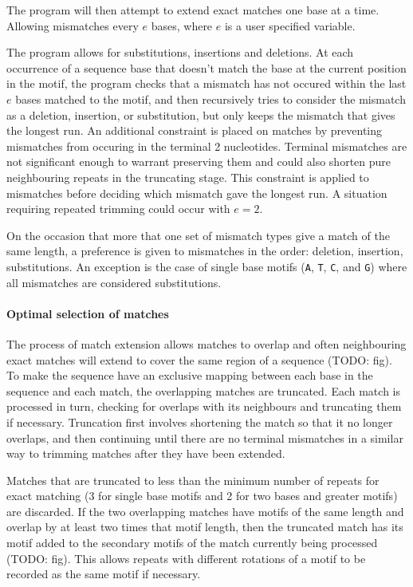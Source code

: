 \documentclass[a4paper]{article}
\begin{document}
The program will then attempt to extend exact matches one base at a time. Allowing mismatches every $e$ bases, where $e$ is a user specified variable.

The program allows for substitutions, insertions and deletions. At each occurrence of a sequence base that doesn't match the base at the current position in the motif, the program checks that a mismatch has not occured within the last $e$ bases matched to the motif, and then recursively tries to consider the mismatch as a deletion, insertion, or substitution, but only keeps the mismatch that gives the longest run. An additional constraint is placed on matches by preventing mismatches from occuring in the terminal 2 nucleotides. Terminal mismatches are not significant enough to warrant preserving them and could also shorten pure neighbouring repeats in the truncating stage. This constraint is applied to mismatches before deciding which mismatch gave the longest run. A situation requiring repeated trimming could occur with $e = 2$. 

On the occasion that more that one set of mismatch types give a match of the same length, a preference is given to mismatches in the order: deletion, insertion, substitutions. An exception is the case of single base motifs (\texttt{A}, \texttt{T}, \texttt{C}, and \texttt{G}) where all mismatches are considered substitutions.

\paragraph{Optimal selection of matches}

The process of match extension allows matches to overlap and often neighbouring exact matches will extend to cover the same region of a sequence (TODO: fig). To make the sequence have an exclusive mapping between each base in the sequence and each match, the overlapping matches are truncated. Each match is processed in turn, checking for overlaps with its neighbours and truncating them if necessary. Truncation first involves shortening the match so that it no longer overlaps, and then continuing until there are no terminal mismatches in a similar way to trimming matches after they have been extended.

Matches that are truncated to less than the minimum number of repeats for exact matching (3 for single base motifs and 2 for two bases and greater motifs) are discarded. If the two overlapping matches have motifs of the same length and overlap by at least two times that motif length, then the truncated match has its motif added to the secondary motifs of the match currently being processed (TODO: fig). This allows repeats with different rotations of a motif to be recorded as the same motif if necessary.
\end{document}
